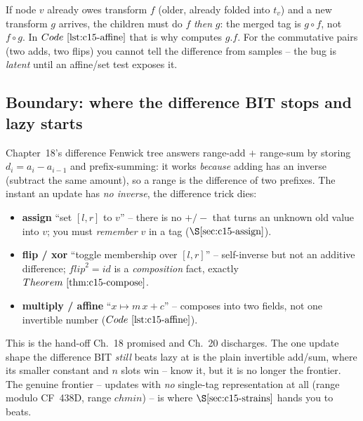 \begin{warningbox}
If node \(v\) already owes transform \(f\) (older, already folded into \(t_v\)) and a new transform \(g\) arrives, the children must do \(f\) \emph{then} \(g\): the merged tag is \(g\circ f\), not \(f\circ g\).  In \(\coderef{c15-affine}\) that is why  computes \(g.\!f\).  For the commutative pairs (two adds, two flips) you cannot tell the difference from samples -- the bug is \emph{latent} until an affine/set test exposes it.
\end{warningbox}

\subsection{Boundary: where the difference BIT stops and lazy starts}

Chapter~18's difference Fenwick tree answers range-add \(+\) range-sum by storing \(d_i=a_i-a_{i-1}\) and prefix-summing: it works \emph{because} adding has an inverse (subtract the same amount), so a range is the difference of two prefixes.  The instant an update has \emph{no inverse}, the difference trick dies:
\begin{itemize}[nosep,leftmargin=1.4em]
  \item \textbf{assign} ``set \([l,r]\) to \(v\)'' -- there is no \(+/-\) that turns an unknown old value into \(v\); you must \emph{remember} \(v\) in a tag (\(\secref{c15-assign}\)).
  \item \textbf{flip / xor} ``toggle membership over \([l,r]\)'' -- self-inverse but not an additive difference; \(\mathit{flip}^2=\mathit{id}\) is a \emph{composition} fact, exactly \(\thmref{c15-compose}\).
  \item \textbf{multiply / affine} ``\(x\mapsto m\,x+c\)'' -- composes into two fields, not one invertible number (\(\coderef{c15-affine}\)).
\end{itemize}
This is the hand-off Ch.~18 promised and Ch.~20 discharges.  The one update shape the difference BIT \emph{still} beats lazy at is the plain invertible add/sum, where its smaller constant and \(n\) slots win -- know it, but it is no longer the frontier.  The genuine frontier -- updates with \emph{no} single-tag representation at all (range modulo CF~438D, range \(\mathit{chmin}\)) -- is where \(\secref{c15-strains}\) hands you to beats.

